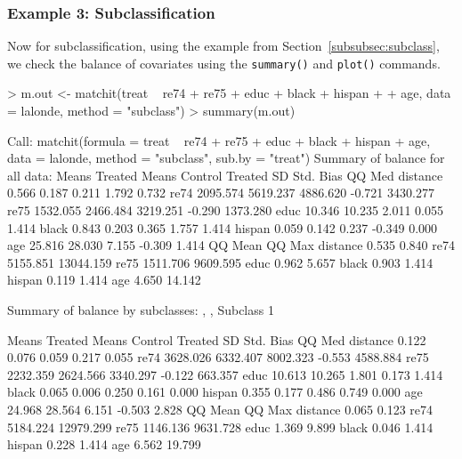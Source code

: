 \documentclass[oneside,letterpaper,titlepage]{article}
\begin{document}
\subsubsection{Example 3: Subclassification}
\label{subsubsec:balancesubclass}
Now for subclassification, using the example from
  Section~\ref{subsubsec:subclass}, we check the balance of covariates
  using the \texttt{summary()} and \texttt{plot()} commands.
\begin{Schunk}
\begin{Sinput}
> m.out <- matchit(treat ~ re74 + re75 + educ + black + hispan + 
+     age, data = lalonde, method = "subclass")
> summary(m.out)
\end{Sinput}
\begin{Soutput}
Call:
matchit(formula = treat ~ re74 + re75 + educ + black + hispan + 
    age, data = lalonde, method = "subclass", sub.by = "treat")
Summary of balance for all data:
         Means Treated Means Control Treated SD Std. Bias   QQ Med
distance         0.566         0.187      0.211     1.792    0.732
re74          2095.574      5619.237   4886.620    -0.721 3430.277
re75          1532.055      2466.484   3219.251    -0.290 1373.280
educ            10.346        10.235      2.011     0.055    1.414
black            0.843         0.203      0.365     1.757    1.414
hispan           0.059         0.142      0.237    -0.349    0.000
age             25.816        28.030      7.155    -0.309    1.414
          QQ Mean    QQ Max
distance    0.535     0.840
re74     5155.851 13044.159
re75     1511.706  9609.595
educ        0.962     5.657
black       0.903     1.414
hispan      0.119     1.414
age         4.650    14.142


Summary of balance by subclasses:
, , Subclass 1

         Means Treated Means Control Treated SD Std. Bias    QQ Med
distance         0.122         0.076      0.059     0.217     0.055
re74          3628.026      6332.407   8002.323    -0.553  4588.884
re75          2232.359      2624.566   3340.297    -0.122   663.357
educ            10.613        10.265      1.801     0.173     1.414
black            0.065         0.006      0.250     0.161     0.000
hispan           0.355         0.177      0.486     0.749     0.000
age             24.968        28.564      6.151    -0.503     2.828
           QQ Mean    QQ Max
distance     0.065     0.123
re74      5184.224 12979.299
re75      1146.136  9631.728
educ         1.369     9.899
black        0.046     1.414
hispan       0.228     1.414
age          6.562    19.799


\end{Soutput}
\end{Schunk}
\end{document}
